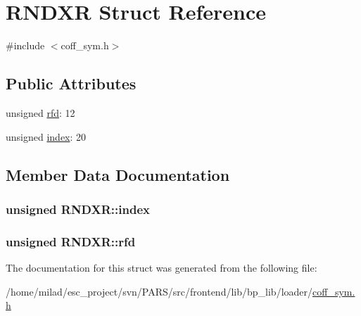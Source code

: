 \hypertarget{structRNDXR}{
\section{RNDXR Struct Reference}
\label{structRNDXR}
}


{\ttfamily \#include $<$coff\_\-sym.h$>$}

\subsection*{Public Attributes}
\begin{DoxyCompactItemize}
\item 
unsigned \hyperlink{structRNDXR_ae6e0ba398f69cf42776984d2a02c7d54}{rfd}: 12
\item 
unsigned \hyperlink{structRNDXR_ad3aa04f3fd51c824337fe7b304c8e38b}{index}: 20
\end{DoxyCompactItemize}


\subsection{Member Data Documentation}
\hypertarget{structRNDXR_ad3aa04f3fd51c824337fe7b304c8e38b}{
\subsubsection[{index}]{\setlength{\rightskip}{0pt plus 5cm}unsigned {\bf RNDXR::index}}}
\label{structRNDXR_ad3aa04f3fd51c824337fe7b304c8e38b}
\hypertarget{structRNDXR_ae6e0ba398f69cf42776984d2a02c7d54}{
\subsubsection[{rfd}]{\setlength{\rightskip}{0pt plus 5cm}unsigned {\bf RNDXR::rfd}}}
\label{structRNDXR_ae6e0ba398f69cf42776984d2a02c7d54}


The documentation for this struct was generated from the following file:\begin{DoxyCompactItemize}
\item 
/home/milad/esc\_\-project/svn/PARS/src/frontend/lib/bp\_\-lib/loader/\hyperlink{coff__sym_8h}{coff\_\-sym.h}\end{DoxyCompactItemize}
